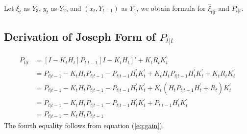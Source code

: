 \documentclass[10pt, titlepage]{article}
\numberwithin{equation}{section}
\begin{document}
Let $\xi_t$ as $Y_3$, $y_t$ as $Y_2$, and $(x_t,Y_{t-1})$ as $Y_1$, we obtain formula for $\hat{\xi}_{t|t}$ and $P_{t|t}$.

\subsection{Derivation of Joseph Form of \texorpdfstring{$P_{t|t}$}{}} \label{ap:joseph}
\begin{align*}
    P_{t|t} &= [I - K_tH_t]P_{t|t-1}[I - K_tH_t]' + K_tR_tK_t^{'} \\
    &= P_{t|t-1} - K_tH_tP_{t|t-1} - P_{t|t-1}H_t^{'}K_t^{'} + K_tH_tP_{t|t-1}H_t^{'}K_t^{'} + K_tR_tK_t^{'} \\
    &= P_{t|t-1} - K_tH_tP_{t|t-1} - P_{t|t-1}H_t^{'}K_t^{'} + K_t(H_tP_{t|t-1}H_t^{'} + R_t)K_t^{'} \\
    &= P_{t|t-1} - K_tH_tP_{t|t-1} - P_{t|t-1}H_t^{'}K_t^{'} + P_{t|t-1}H_t^{'}K_t^{'} \\
    &= P_{t|t-1} - K_tH_tP_{t|t-1}
\end{align*}
The fourth equality follows from equation (\ref{eq:gain}).
\end{document}
